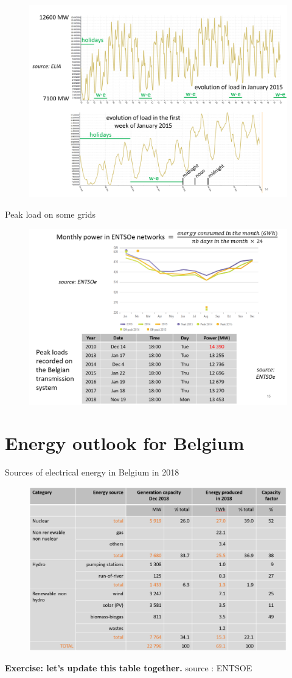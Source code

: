 \begin{frame}
\begin{figure}
\centering
\includegraphics[width=0.6\linewidth]{images/consumption_be_zoom.png}
\end{figure}
\end{frame}

\begin{frame}
{Peak load on some grids}
\begin{figure}
\centering
\includegraphics[width=0.6\linewidth]{images/peaks_BE.png}
\end{figure}
\end{frame}


\section{Energy outlook for Belgium}

\begin{frame}{Sources of electrical energy in Belgium in 2018}
\begin{figure}
\centering
\includegraphics[width=0.6\linewidth]{images/sources_BE.png}
\end{figure}

\textbf{Exercise: let's update this table together.} \footnotesize{source : ENTSOE}

\end{frame}

